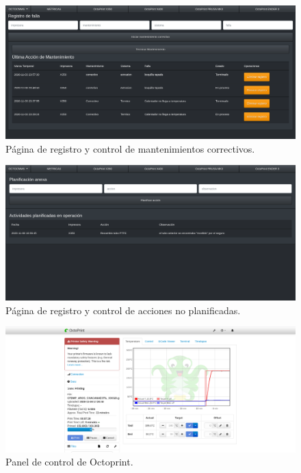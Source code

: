 \begin{figure}[H]
\centering
\includegraphics[scale=0.4,angle=90]{images/registrocorrectivo.png}
\caption{Página de registro y control de mantenimientos correctivos.}
\label{registrocorrectivo}
\end{figure}

\begin{figure}[H]
\centering
\includegraphics[scale=0.4,angle=90]{images/registronoplanificado.png}
\caption{Página de registro y control de acciones no planificadas.}
\label{registronoplanificado}
\end{figure}

\begin{figure}[H]
\centering
\includegraphics[scale=0.4,angle=90]{images/paneloctoprint.png}
\caption{Panel de control de Octoprint.}
\label{paneloctoprint}
\end{figure}

